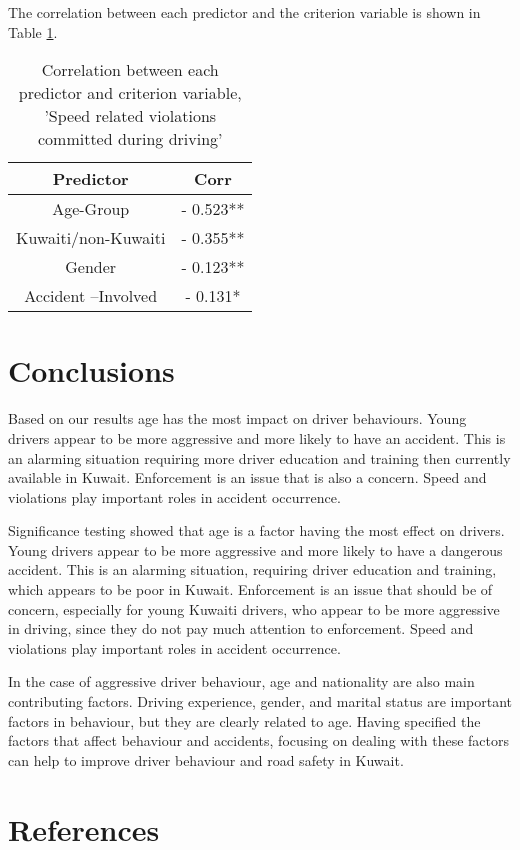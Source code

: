 \documentclass[preprint,12pt,a4paper,authoryear]{elsarticle}
\begin{document}
The correlation between each predictor and the criterion variable is shown in Table \ref{tab:corr}.

\begin{table}[H]
\centering
\caption{Correlation between each predictor and criterion variable, 'Speed related violations committed during driving'}
\label{tab:corr}
\begin{tabular}{@{}cc@{}}
\toprule
\textbf{Predictor} & \textbf{Corr} \\ \midrule
Age-Group & - 0.523** \\
Kuwaiti/non-Kuwaiti & - 0.355** \\
Gender & - 0.123** \\
Accident –Involved & - 0.131* \\ \bottomrule
\end{tabular}
\end{table}

\section{Conclusions}
Based on our results age has the most impact on driver behaviours. Young drivers appear to be more aggressive and more likely to have an accident. This is an alarming situation requiring more driver education and training then currently available in Kuwait. Enforcement is an issue that is also a concern. Speed and violations play important roles in accident occurrence. 

Significance testing showed that age is a factor having the most effect on drivers. Young drivers appear to be more aggressive and more likely to have a dangerous accident. This is an alarming situation, requiring driver education and training, which appears to be poor in Kuwait. Enforcement is an issue that should be of concern, especially for young Kuwaiti drivers, who appear to be more aggressive in driving, since they do not pay much attention to enforcement. Speed and violations play important roles in accident occurrence. 

In the case of aggressive driver behaviour, age and nationality are also main contributing factors. Driving experience, gender, and marital status are important factors in behaviour, but they are clearly related to age. Having specified the factors that affect behaviour and accidents, focusing on dealing with these factors can help to improve driver behaviour and road safety in Kuwait.  
  
\section{References}

{}
%


\end{document}
